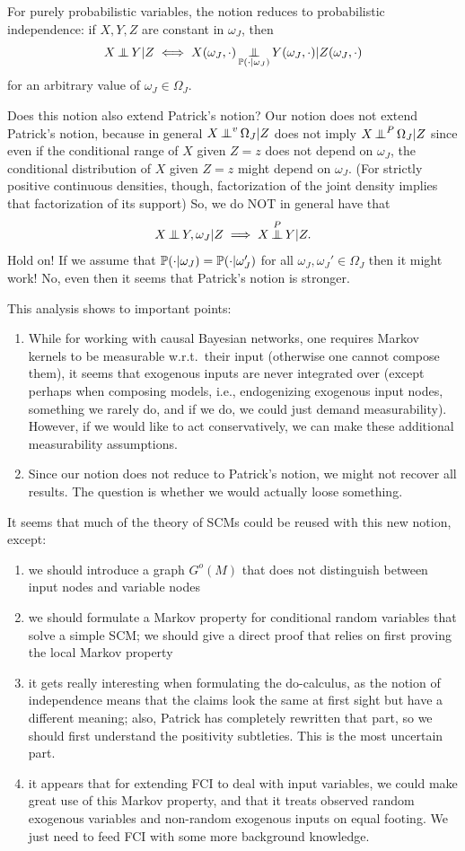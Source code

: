 For purely probabilistic variables, the notion reduces to probabilistic independence:
if $X,Y,Z$ are constant in $\omega_J$, then
$$X \operatorname*{\perp\mkern-11mu\perp} Y | Z \iff X(\omega_J,\cdot) \operatorname*{\perp\mkern-11mu\perp}_{\mathbb{P}(\cdot|\omega_J)} Y(\omega_J,\cdot) | Z(\omega_J,\cdot)$$
for an arbitrary value of $\omega_J \in \Omega_J$.

Does this notion also extend Patrick's notion?
Our notion does not extend Patrick's notion, because in general $X \operatorname*{\perp\mkern-11mu\perp}^v \Omega_J | Z$ does not imply $X \operatorname*{\perp\mkern-11mu\perp}^P \Omega_J | Z$ since even if the conditional range of $X$ given $Z=z$ does not depend on $\omega_J$, the conditional distribution of $X$ given $Z=z$ might depend on $\omega_J$.
(For strictly positive continuous densities, though, factorization of the joint density implies that factorization of its support)
So, we do NOT in general have that
$$X \operatorname*{\perp\mkern-11mu\perp} Y,\omega_J | Z \implies X \operatorname*{\perp\mkern-11mu\perp}^P Y | Z.$$
Hold on! If we assume that 
$\mathbb{P}( \cdot | \omega_J) = \mathbb{P}(\cdot | \omega_J')$ for all $\omega_J,\omega_J' \in \Omega_J$ then it might work!
No, even then it seems that Patrick's notion is stronger.

This analysis shows to important points:
\begin{enumerate}
  \item While for working with causal Bayesian networks, one requires Markov kernels to be measurable w.r.t.\ their input (otherwise one cannot compose them), it seems that exogenous inputs are never integrated over (except perhaps when composing models, i.e., endogenizing exogenous input nodes, something we rarely do, and if we do, we could just demand measurability).
    However, if we would like to act conservatively, we can make these additional measurability assumptions.
  \item Since our notion does not reduce to Patrick's notion, we might not recover all results. The question is whether we would actually loose something.
\end{enumerate}

It seems that much of the theory of SCMs could be reused with this new notion, except:
\begin{enumerate}
  \item we should introduce a graph $G^o(M)$ that does not distinguish between input nodes and variable nodes
  \item we should formulate a Markov property for conditional random variables that solve a simple SCM; we should give a direct proof that relies on first proving the local Markov property
  \item it gets really interesting when formulating the do-calculus, as the notion of independence means that the claims look the same at first sight but have a different meaning; also, Patrick has completely rewritten that part, so we should first understand the positivity subtleties. This is the most uncertain part.
  \item it appears that for extending FCI to deal with input variables, we could make great use of this Markov property, and that it treats observed random exogenous variables and non-random exogenous inputs on equal footing. We just need to feed FCI with some more background knowledge.
\end{enumerate}

